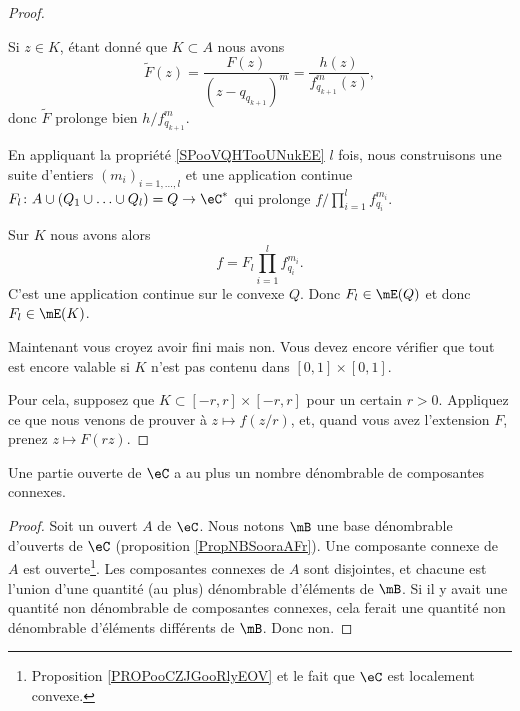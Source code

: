 \begin{proof}
\begin{subproof}
		Si \( z\in K\), étant donné que \( K\subset A\) nous avons
		\begin{equation}
			\tilde F(z)=\frac{ F(z) }{ (z-q_{q_{k+1}})^{m}}=\frac{h(z)}{   f_{q_{k+1}}^{m}(z)    },
		\end{equation}
		donc \( \tilde F\) prolonge bien \( h/   f_{q_{k+1}}^{m}      \).

		\spitem[Récurrence]
		En appliquant la propriété \ref{SPooVQHTooUNukEE} \( l\) fois, nous construisons une suite d'entiers \( (m_i)_{i=1,\ldots,l}\) et une application continue \(F_l \colon A\cup(Q_1\cup\ldots\cup Q_l)=Q\to \eC^*  \) qui prolonge \( f/\prod_{i=1}^lf_{q_i}^{m_i}\).

		Sur \( K\) nous avons alors
		\begin{equation}
			f=F_l\prod_{i=1}^lf_{q_i}^{m_i}.
		\end{equation}
		C'est une application continue sur le convexe \( Q\). Donc \( F_l\in\mE(Q)\) et donc \( F_l\in\mE(K)\).
	\end{subproof}
	Maintenant vous croyez avoir fini mais non. Vous devez encore vérifier que tout est encore valable si \( K\) n'est pas contenu dans \( [0 ,1]\times [0 ,1]\).

	Pour cela, supposez que \( K\subset[-r ,r]\times [-r ,r]\) pour un certain \( r>0\). Appliquez ce que nous venons de prouver à \( z\mapsto f(z/r)\), et, quand vous avez l'extension \( F\), prenez \( z\mapsto F(rz)\).
\end{proof}

\begin{lemma} 	\label{LEMooBHOGooXxBYGA}
	Une partie ouverte de \( \eC\) a au plus un nombre dénombrable de composantes connexes.
\end{lemma}

\begin{proof}
	Soit un ouvert \( A\) de \( \eC\). Nous notons \( \mB\) une base dénombrable d'ouverts de \( \eC\) (proposition \ref{PropNBSooraAFr}). Une composante connexe de \( A\) est ouverte\footnote{Proposition \ref{PROPooCZJGooRlyEOV} et le fait que \( \eC\) est localement convexe.}. Les composantes connexes de \( A\) sont disjointes, et chacune est l'union d'une quantité (au plus) dénombrable d'éléments de \( \mB\). Si il y avait une quantité non dénombrable de composantes connexes, cela ferait une quantité non dénombrable d'éléments différents de \( \mB\). Donc non.
\end{proof}

